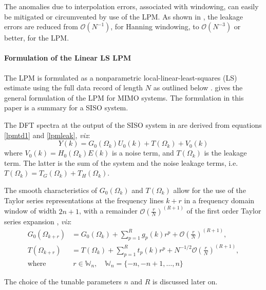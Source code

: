 The anomalies due to interpolation errors, associated with windowing, can easily be mitigated or circumvented by use of the LPM. As shown in \citep{Pintelon2012}, the leakage errors are reduced from  $\mathcal{O}({N}^{-1})$, for Hanning windowing, to $\mathcal{O}({N}^{-3})$ or better, for the LPM.


\paragraph{Formulation of the Linear LS LPM}
The LPM is formulated as a nonparametric local-linear-least-squares (LS) estimate using the full data record of length $N$ as outlined below \citep{Schoukens2009LPM}. 
\citet[Section 7.2.2]{Pintelon2012} gives the general formulation of the \gls{LPM} for \gls{MIMO} systems. 
The formulation in this paper is a summary for a \gls{SISO} system.

The \gls{DFT} spectra at the output of the \gls{SISO} system in  are derived from equations \eqref{lpmtd1} and \eqref{lpmleak}, \emph{viz}:
\begin{equation}\label{lpm1spectra}
Y(k)=G_0(\Omega_k)U_0(k)+T(\Omega_k)+V_0(k)
\end{equation}
where $V_0(k) = H_0(\Omega_k)E(k)$ is a noise term, and $T(\Omega_k)$ is the leakage term. The latter is the sum of the system and the noise leakage terms, i.e. $T(\Omega_k) = T_G(\Omega_k) + T_H(\Omega_k)$.

The smooth characteristics of $G_0(\Omega_k)$ and $T(\Omega_k)$ allow for the use of the Taylor series representations at the frequency lines $k+r$ in a frequency domain window of width $2n+1$, with a remainder $\mathcal{O}\left(\frac{r}{N}\right)^{(R+1)}$ of the first order Taylor series expansion \citep{Schoukens2009LPM}, \emph{viz}:
\begin{align}\label{lpmGTaylorS}
G_0(\Omega_{k+r})&=G_0(\Omega_k)+\sum_{p=1}^{R}g_p(k)r^p+\mathcal{O}\left(\frac{r}{N}\right)^{(R+1)},
\\
\label{lpmTTaylorS}
T(\Omega_{k+r})&=T(\Omega_k)+\sum_{p=1}^{R}t_p(k)r^p+N^{-1/2}\mathcal{O}\left(\frac{r}{N}\right)^{(R+1)},
\\
\text{where}&\ r\in\mathbb{W}_n,\quad \mathbb{W}_n = \{-n,-n+1,\dots,n\}
\end{align}

The choice of the tunable parameters $n$ and $R$ is discussed later on.

